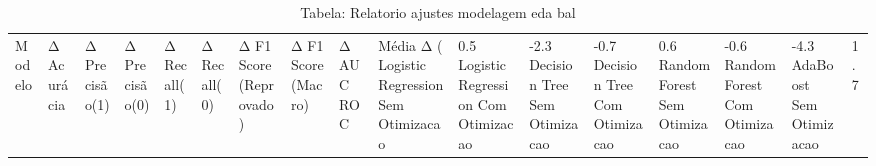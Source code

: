 \begin{table}[H] %
    \centering
    \caption{Tabela: Relatorio ajustes modelagem eda bal}
    \label{tab:relatorio_ajustes_modelagem_eda_bal}
    \renewcommand{\arraystretch}{1.25} %
    \begin{adjustwidth}{ -1in }{ -1in } %
    \centering %
    \small %
    \begin{tabular}{lllllllllll}
\toprule
                            Modelo & Δ Acurácia & Δ Precisão(1) & Δ Precisão(0) & Δ Recall(1) & Δ Recall(0) & Δ F1 Score (Reprovado) & Δ F1 Score (Macro) & Δ AUC ROC & Média Δ (%
\midrule
Logistic Regression Sem Otimizacao &       0.5%
Logistic Regression Com Otimizacao &      -2.3%
      Decision Tree Sem Otimizacao &      -0.7%
      Decision Tree Com Otimizacao &       0.6%
      Random Forest Sem Otimizacao &      -0.6%
      Random Forest Com Otimizacao &      -4.3%
           AdaBoost Sem Otimizacao &       1.7%

\end{tabular}
\end{adjustwidth}
\end{table}
